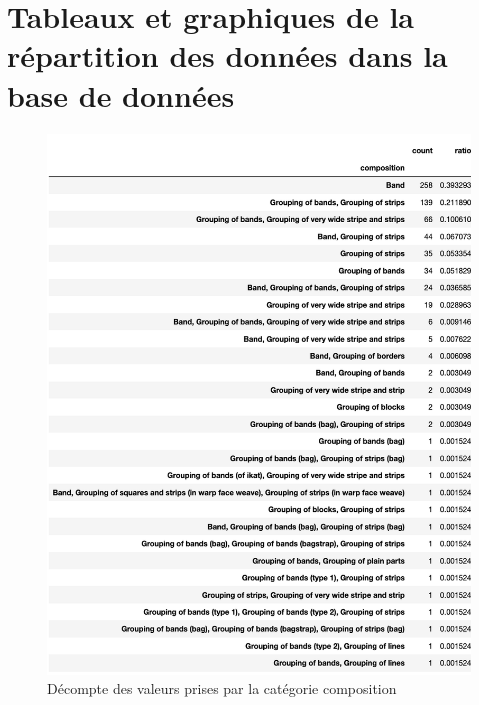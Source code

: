 \documentclass[a4paper, twoside]{book}
\begin{document}
\clearpage

\section[Graphiques]{Tableaux et graphiques de la répartition des données dans la base de données}

\begin{figure}[!h]
        \begin{center}
        		\includegraphics[width=12cm]{../images/count_composition.png}
	\end{center}
    \caption{Décompte des valeurs prises par la catégorie \og composition \fg}     
    \label{fig:composition}
\end{figure}
\end{document}
